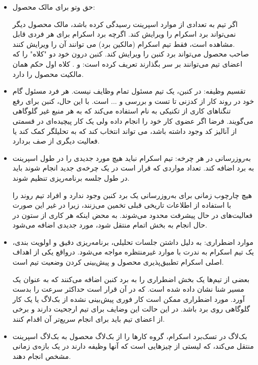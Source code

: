 {\begin{itemize}

\item حق وتو برای مالک محصول:

اگر تیم به تعدادی از موارد اسپرینت رسیدگی کرده باشد، مالک محصول دیگر نمی‌تواند برد اسکرام را ویرایش کند. اگرچه برد اسکرام برای هر فردی قابل مشاهده است، فقط تیم اسکرام (مالکین برد) می توانند آن را ویرایش کنند.
\\
صاحب محصول می‌تواند برد کنبن را ویرایش کند. کنبن درون خود دو "کلاه" را که اعضای تیم می‌توانند بر سر بگذارند تعریف کرده است:  و . کلاه اول حکم همان مالکیت محصول را دارد.

\item تقسیم وظیفه:
در کنبن، یک تیم مسئول تمام وظایف نیست. هر فرد مسئول گام خود در روند کار از کدزنی تا تست و بررسی و ... است. با این حال، کنبن برای رفع تنگنا‌های کاری از تکنیکی به نام  استفاده می‌کند که به هر منبع غیر گلوگاهی می‌گویند. فرضا اگر عضوی کار خود را انجام داده ولی یک کار پیچیده‌ای در قسمتی از آنالیز کد وجود داشته باشد، می تواند انتخاب کند که به تحلیلگر کمک کند یا فعالیت دیگری از صف بردارد.
\item به‌روزرسانی در هر چرخه:
تیم اسکرام نباید هیچ مورد جدیدی را در طول اسپرینت به برد اضافه کند. تعداد مواردی که قرار است در یک چرخه‌ی جدید انجام شوند باید در طول جلسه برنامه‌ریزی تنظیم شوند.

هیچ چارچوب زمانی برای به‌روزرسانی یک برد کنبن وجود ندارد و افراد تیم روند را با استفاده از اطلاعات تاریخی قبلی تخمین می‌زنند، زیرا در غیر این صورت فعالیت‌های در حال پیشرفت محدود می‌شوند. به محض اینکه هر کاری از ستون در حال انجام به بخش اتمام منتقل شود، مورد جدیدی اضافه می‌شود.

\item موارد اضطراری:
به دلیل داشتن جلسات تحلیلی، برنامه‌ریزی دقیق و اولویت بندی، یک تیم اسکرام به ندرت با موارد غیرمنتظره مواجه می‌شود. درواقع یکی از اهداف اصلی اسکرام تطبیق‌پذیری محصول و پیش‌بینی کردن وضعیت تیم است.

بعضی از تیم‌ها یک بخش اضطراری را به برد کنبن اضافه می‌کنند که به عنوان یک مسیر شنا نشان داده شده است. که در آن قرار است حداکثر سرعت را بدست آورد. مورد اضطراری ممکن است کار فوری پیش‌بینی نشده از بک‌لاگ یا یک کار گلوگاهی روی برد باشد. در این حالت این وضایف برای تیم ارجحیت دارند و برخی از اعضای تیم باید برای انجام سریع‌تر آن اقدام کنند.

\item بک‌لاگ
در تسک‌برد اسکرام، گروه کار‌ها را از بک‌لاگ محصول به بک‌لاگ اسپرینت منتقل می‌کند، که لیستی از چیزهایی است که آنها وظیفه دارند در یک بازه‌ی زمانی مشخص انجام دهند.


\end{itemize}}
